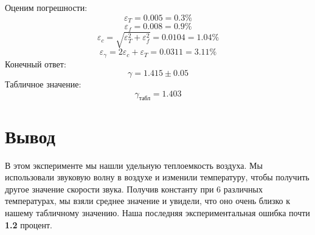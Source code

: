 \documentclass[a4paper, 12pt]{article}%
\begin{document}
Оценим погрешности:
\[
\varepsilon_{T} = 0.005 = 0.3\%
\]
\[
\varepsilon_{f} = 0.008 = 0.9\%
\]
\[
 \varepsilon_c = \sqrt{\varepsilon_{T}^2 + \varepsilon_{f}^2} = 0.0104 = 1.04\%
\]
\[
	\varepsilon_{\gamma} = 2 \varepsilon_c + \varepsilon_T = 0.0311 = 3.11\%
\]
Конечный ответ:
\[
	\boxed {\gamma = 1.415 \pm 0.05}
\]
Табличное значение:
\[
	\boxed {\gamma_{\text{табл}} = 1.403}
\]

\section{Вывод}
В этом эксперименте мы нашли удельную теплоемкость воздуха. Мы использовали звуковую волну в воздухе и изменили температуру, чтобы получить другое значение скорости звука. Получив константу при 6 различных температурах, мы взяли среднее значение и увидели, что оно очень близко к нашему табличному значению. Наша последняя экспериментальная ошибка почти \textbf{1.2} процент.
\end{document}
